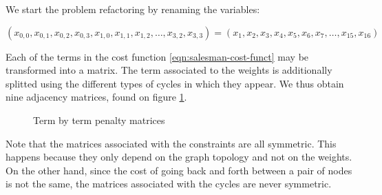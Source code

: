 \begin{table}[H]
	\centering
	\caption{Graphical representation of penalties between interactions \cite{Sarkar2020}}
	\label{fig:salesman-penalties}
\end{table}

We start the problem refactoring by renaming the variables:

$$ (x_{0,0}, x_{0,1}, x_{0,2}, x_{0,3}, x_{1,0}, x_{1,1}, x_{1,2}, \dots, x_{3,2}, x_{3,3}) =
(x_1, x_2, x_3, x_4, x_5, x_6, x_7, \dots, x_{15}, x_{16}) $$

Each of the terms in the cost function \ref{eqn:salesman-cost-funct} may be transformed into a matrix. The term associated to the weights is additionally splitted using the different types of cycles in which they appear. We thus obtain nine adjacency matrices, found on figure \ref{fig:salesman-adj-matrices}.

\begin{figure}[H]
	\centering
	\caption{Term by term penalty matrices \cite{Sarkar2020}}
	\label{fig:salesman-adj-matrices}
\end{figure}

Note that the matrices associated with the constraints are all symmetric. This happens because they only depend on the graph topology and not on the weights. On the other hand, since the cost of going back and forth between a pair of nodes is not the same, the matrices associated with the cycles are never symmetric.

